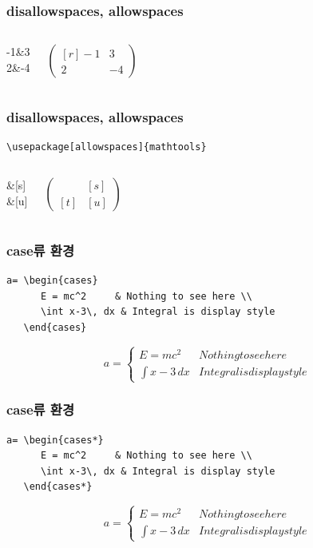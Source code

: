 \documentclass{beamer}
\begin{document}
\begin{frame}[fragile]
\frametitle{disallowspaces, allowspaces}
\begin{columns}[c]
\column{1.5in}
\begin{Verbatim*}
\begin{pmatrix*} [r]
-1&3\\
2&-4
\end{pmatrix*}
\end{Verbatim*}
\column{1.5in}
\Large
\[
\begin{pmatrix*} [r]
-1&3\\
2&-4
\end{pmatrix*}
\]
\end{columns}
\end{frame}

\begin{frame}[fragile, t]
\frametitle{disallowspaces, allowspaces}
\begin{verbatim}
\usepackage[allowspaces]{mathtools}
\end{verbatim}

\begin{columns}[c]
\column{1.5in}
\begin{Verbatim*}
\begin{pmatrix*}
[r]&[s]\\
[t]&[u]
\end{pmatrix*}
\end{Verbatim*}
\column{1.5in}
\Large
\[
\begin{pmatrix*}
&[s]\\
[t]&[u]
\end{pmatrix*}
\]
\end{columns}
\end{frame}

\begin{frame}[fragile,t]
\frametitle{case류 환경}
\begin{verbatim}
a= \begin{cases}
      E = mc^2     & Nothing to see here \\
      \int x-3\, dx & Integral is display style
   \end{cases}
\end{verbatim}
\[
a= \begin{cases}
      E = mc^2     & Nothing to see here \\
      \int x-3\, dx & Integral is display style
   \end{cases}
\]
\end{frame}

\begin{frame}[fragile,t]
\frametitle{case류 환경}
\begin{verbatim}
a= \begin{cases*}
      E = mc^2     & Nothing to see here \\
      \int x-3\, dx & Integral is display style
   \end{cases*}
\end{verbatim}
\[
a= \begin{cases*}
      E = mc^2     & Nothing to see here \\
      \int x-3\, dx & Integral is display style
   \end{cases*}
\]
\end{frame}
\end{document}
